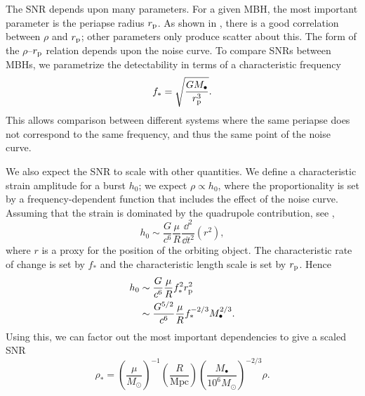 The SNR depends upon many parameters. For a given MBH, the most important parameter is the periapse radius $r_\mathrm{p}$. As shown in , there is a good correlation between $\rho$ and $r_\mathrm{p}$; other parameters only produce scatter about this. The form of the $\rho$--$r_\mathrm{p}$ relation depends upon the noise curve. To compare SNRs between MBHs, we parametrize the detectability in terms of a characteristic frequency
\begin{equation}
f_\ast = \sqrt{\frac{GM_\bullet}{r_\mathrm{p}^3}}.
\end{equation}
This allows comparison between different systems where the same periapse does not correspond to the same frequency, and thus the same point of the noise curve.

We also expect the SNR to scale with other quantities. We define a characteristic strain amplitude for a burst $h_0$; we expect $\rho \propto h_0$, where the proportionality is set by a frequency-dependent function that includes the effect of the noise curve. Assuming that the strain is dominated by the quadrupole contribution, see , 
\begin{equation}
h_0 \sim \frac{G}{c^6}\frac{\mu}{R}\frac{\dd^2}{\dd t^2}\left(r^2\right),
\end{equation}
where $r$ is a proxy for the position of the orbiting object. The characteristic rate of change is set by $f_\ast$ and the characteristic length scale is set by $r_\mathrm{p}$. Hence
\begin{align}
h_0 \sim {} & \frac{G}{c^6}\frac{\mu}{R}f_\ast^2 r_\mathrm{p}^2 \\
 \sim {} & \frac{G^{5/2}}{c^6}\frac{\mu}{R}f_\ast^{-2/3}M_\bullet^{2/3}.
\end{align}
Using this, we can factor out the most important dependencies to give a scaled SNR
\begin{equation}
\rho_\ast = \left(\frac{\mu}{M_\odot}\right)^{-1}\left(\frac{R}{\mathrm{Mpc}}\right)\left(\frac{M_\bullet}{10^6 M_\odot}\right)^{-2/3}\rho.
\label{eq:SNR-scaling}
\end{equation}


